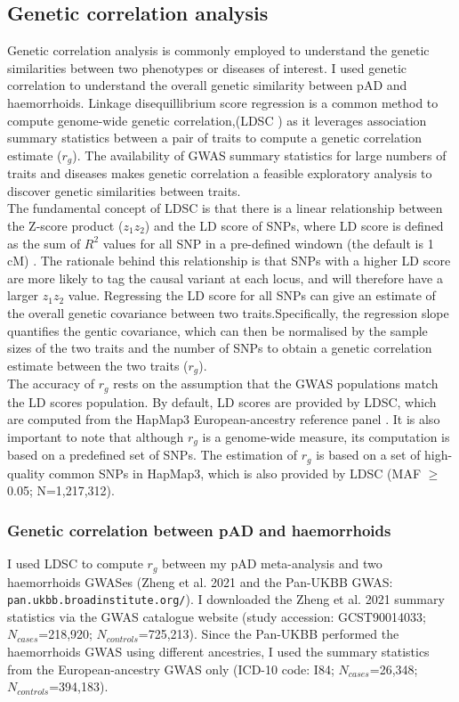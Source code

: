\subsection{Genetic correlation analysis}
Genetic correlation analysis is commonly employed to understand the genetic similarities between two phenotypes or diseases of interest. I used genetic correlation to understand the overall genetic similarity between pAD and haemorrhoids. Linkage disequillibrium score regression is a common method to compute genome-wide genetic correlation,(LDSC \cite{Bulik-Sullivan2015-fk}) as it leverages association summary statistics between a pair of traits to compute a genetic correlation estimate ($r_{g}$). The availability of GWAS summary statistics for large numbers of traits and diseases makes genetic correlation a feasible exploratory analysis to discover genetic similarities between traits.\\

The fundamental concept of LDSC is that there is a linear relationship between the Z-score product ($z_{1}z_{2}$) and the LD score of SNPs, where LD score is defined as the sum of $R^{2}$ values for all SNP in a pre-defined windown (the default is 1 cM) \cite{Bulik-Sullivan2015-ts}. The rationale behind this relationship is that SNPs with a higher LD score are more likely to tag the causal variant at each locus, and will therefore have a larger $z_{1}z_{2}$ value. Regressing the LD score for all SNPs can give an estimate of the overall genetic covariance between two traits.Specifically, the regression slope quantifies the gentic covariance, which can then be normalised by the sample sizes of the two traits and the number of SNPs to obtain a genetic correlation estimate between the two traits ($r_{g}$).\\

The accuracy of $r_{g}$ rests on the assumption that the GWAS populations match the LD scores population. By default, LD scores are provided by LDSC, which are computed from the HapMap3 European-ancestry reference panel \cite{hapmap}. It is also important to note that although $r_{g}$ is a genome-wide measure, its computation is based on a predefined set of SNPs. The estimation of $r_{g}$ is based on a set of high-quality common SNPs in HapMap3, which is also provided by LDSC (MAF $\geq$ 0.05; N=1,217,312).

\subsubsection{Genetic correlation between pAD and haemorrhoids}
I used LDSC to compute $r_{g}$ between my pAD meta-analysis and two haemorrhoids GWASes (Zheng et al. 2021 \cite{Zheng2021-ss} and the Pan-UKBB GWAS: \Verb+pan.ukbb.broadinstitute.org/+). I downloaded the Zheng et al. 2021 summary statistics via the GWAS catalogue website (study accession: GCST90014033; $N_{cases}$=218,920; $N_{controls}$=725,213). Since the Pan-UKBB performed the haemorrhoids GWAS using different ancestries, I used the summary statistics from the European-ancestry GWAS only (ICD-10 code: I84; $N_{cases}$=26,348; $N_{controls}$=394,183). \\


